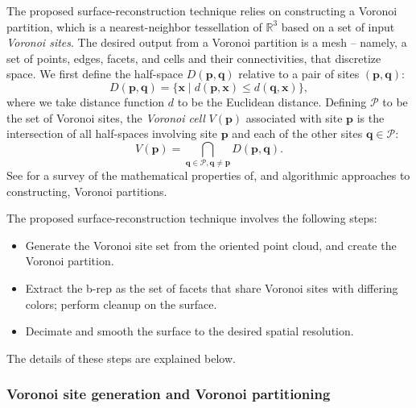 The proposed surface-reconstruction technique relies on constructing a Voronoi partition, which is a nearest-neighbor tessellation of $\mathbb{R}^3$ based on a set of input \textit{Voronoi sites}. The desired output from a Voronoi partition is a mesh -- namely, a set of points, edges, facets, and cells and their connectivities, that discretize space. We first define the half-space $D(\bm{p},\bm{q})$ relative to a pair of sites $(\bm{p}, \bm{q})$:
\begin{equation}
D(\bm{p},\bm{q}) = \{\bm{x} \mid d(\bm{p},\bm{x}) \leq d(\bm{q},\bm{x})\},
\end{equation}
where we take distance function $d$ to be the Euclidean distance.  Defining $\mathcal{P}$ to be the set of Voronoi sites, the \textit{Voronoi cell} $V(\bm{p})$ associated with site $\bm{p}$ is the intersection of all half-spaces involving site $\bm{p}$ and each of the other sites $\bm{q} \in \mathcal{P}$:
\begin{equation}
V(\bm{p}) = \bigcap \limits_{\bm{q} \in \mathcal{P}, \bm{q} \neq \bm{p}} D(\bm{p},\bm{q}).
\end{equation} See \cite{aurenhammer_1991} for a survey of the mathematical properties of, and algorithmic approaches to constructing, Voronoi partitions.

The proposed surface-reconstruction technique involves the following steps:
\vspace{3mm}
\begin{itemize}[noitemsep]
\item Generate the Voronoi site set from the oriented point cloud, and create the Voronoi partition.
\item Extract the b-rep as the set of facets that share Voronoi sites with differing colors; perform cleanup on the surface.
\item Decimate and smooth the surface to the desired spatial resolution.
\end{itemize}
\vspace{3mm}
The details of these steps are explained below.

\subsubsection{Voronoi site generation and Voronoi partitioning}

